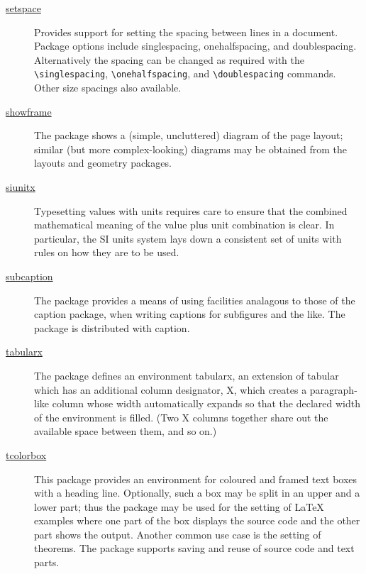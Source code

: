 \begin{description}
	\item[\href{https://www.ctan.org/pkg/setspace}{setspace}] Provides support for setting the spacing between lines in a document. Package options include singlespacing, onehalfspacing, and doublespacing. Alternatively the spacing can be changed as required with the \verb|\singlespacing|, \verb|\onehalfspacing|, and \verb|\doublespacing| commands. Other size spacings also available. \cite{CTANTeam.2020bu}
	
	\item[\href{https://www.ctan.org/pkg/showframe}{showframe}] The package shows a (simple, uncluttered) diagram of the page layout; similar (but more complex-looking) diagrams may be obtained from the layouts and geometry packages. \cite{CTANTeam.2020bm}
	
	\item[\href{https://www.ctan.org/pkg/siunitx}{siunitx}] Typesetting values with units requires care to ensure that the combined mathematical meaning of the value plus unit combination is clear. In particular, the SI units system lays down a consistent set of units with rules on how they are to be used. \cite{CTANTeam.2020s}
	
	\item[\href{https://www.ctan.org/pkg/subcaption}{subcaption}] The package provides a means of using facilities analagous to those of the caption package, when writing captions for subfigures and the like. The package is distributed with caption. \cite{CTANTeam.2020l}
	
	\item[\href{https://www.ctan.org/pkg/tabularx}{tabularx}] The package defines an environment tabularx, an extension of tabular which has an additional column designator, X, which creates a paragraph-like column whose width automatically expands so that the declared width of the environment is filled. (Two X columns together share out the available space between them, and so on.) \cite{CTANTeam.2020p}
	
	\item[\href{https://www.ctan.org/pkg/tcolorbox}{tcolorbox}] This package provides an environment for coloured and framed text boxes with a heading line. Optionally, such a box may be split in an upper and a lower part; thus the package may be used for the setting of {\LaTeX} examples where one part of the box displays the source code and the other part shows the output. Another common use case is the setting of theorems. The package supports saving and reuse of source code and text parts. \cite{CTANTeam.2020bq}
	

\end{description}
